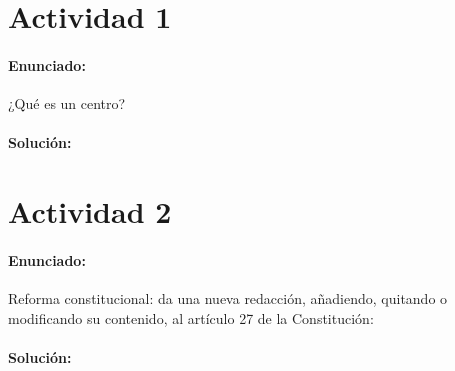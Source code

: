 
\section*{Actividad 1}
\paragraph{Enunciado: }
¿Qué es un centro?
\paragraph{Solución: }

\newpage
\section*{Actividad 2}
\paragraph{Enunciado: }
Reforma constitucional: da una nueva redacción, añadiendo, quitando o modificando su contenido, al artículo 27 de la Constitución:
\paragraph{Solución: }

